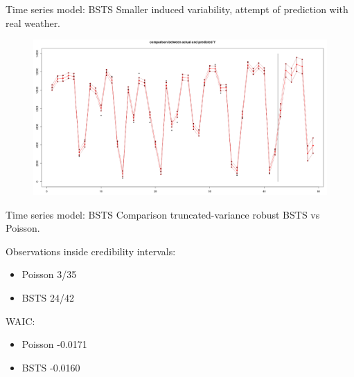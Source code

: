 \documentclass{beamer}
\begin{document}
\begin{frame}{Time series model: BSTS}
Smaller induced variability, \alert{attempt of prediction} with real weather.
\begin{figure}[H]
	\centering
	\includegraphics[width=1\linewidth]{pictures/good2.png} 
	\label{fig4}
\end{figure}

\end{frame}

\begin{frame}{Time series model: BSTS}
\alert{Comparison} truncated-variance robust BSTS vs Poisson.

Observations inside \alert{credibility intervals}:
\begin{itemize}
	\item Poisson 3/35
	\item BSTS 24/42
\end{itemize} 

\alert{WAIC}:
\begin{itemize}
	\item Poisson -0.0171
	\item BSTS -0.0160
\end{itemize} 

\end{frame}
\end{document}
